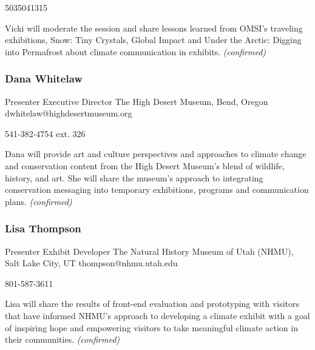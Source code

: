 \documentclass{report}
\begin{document}
                5035041315\newline

                Vicki will moderate the session and share lessons learned from OMSI’s traveling exhibitions, Snow: Tiny Crystals, Global Impact and Under the Arctic: Digging into Permafrost about climate communication in exhibits.\newline
                \emph{ (confirmed) }
              

              
                \subsubsection*{ Dana Whitelaw }
                Presenter\newline
                Executive Director\newline
                The High Desert Museum, Bend, Oregon
                \newline
                dwhitelaw@highdesertmuseum.org\newline
                
                541-382-4754 ext. 326\newline

                Dana will provide art and culture perspectives and approaches to climate change and conservation content from the High Desert Museum’s blend of wildlife, history, and art. She will share the museum’s approach to integrating conservation messaging into temporary exhibitions, programs and communication plans.
                \emph{ (confirmed) }
              

              
                \subsubsection*{ Lisa Thompson }
                Presenter\newline
                Exhibit Developer\newline
                The Natural History Museum of Utah (NHMU), Salt Lake City, UT
                \newline
                thompson@nhmu.utah.edu\newline
                
                801-587-3611\newline

                Lisa will share the results of front-end evaluation and prototyping with visitors that have informed NHMU’s approach to developing a climate exhibit with a goal of inspiring hope and empowering visitors to take meaningful climate action in their communities.
                \emph{ (confirmed) }
              
\end{document}
